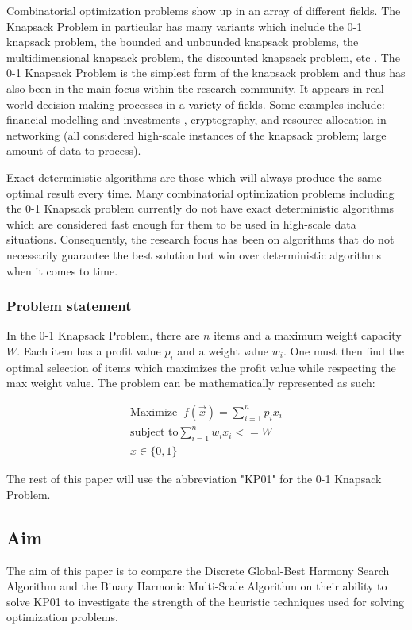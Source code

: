 \documentclass[titlepage]{article}
\begin{document}
Combinatorial optimization problems show up in an array of different fields. The Knapsack Problem in particular has many variants which include the 0-1 knapsack problem, the bounded and unbounded knapsack problems, the multidimensional knapsack problem, the discounted knapsack problem, etc \cite{knapsackVariants}. The 0-1 Knapsack Problem is the simplest form of the knapsack problem and thus has also been in the main focus within the research community. It appears in real-world decision-making processes in a variety of fields. Some examples include: financial modelling and investments \cite{finance}, cryptography, and resource allocation in networking \cite{resource} (all considered high-scale instances of the knapsack problem; large amount of data to process).

Exact deterministic algorithms are those which will always produce the same optimal result every time. Many combinatorial optimization problems including the 0-1 Knapsack problem currently do not have exact deterministic algorithms which are considered fast enough for them to be used in high-scale data situations. Consequently, the research focus has been on algorithms that do not necessarily guarantee the best solution but win over deterministic algorithms when it comes to time. 

\subsubsection*{Problem statement}
In the 0-1 Knapsack Problem, there are $n$ items and a maximum weight capacity $W$. Each item has a profit value $p_i$ and a weight value $w_i$. One must then find the optimal selection of items which maximizes the profit value while respecting the max weight value. The problem can be mathematically represented as such:

\vskip -0.5cm

\begin{gather}
    \text{Maximize}\;\; f(\Vec{x}) = \sum_{i = 1}^{n} p_i x_i \\
    \text{subject to} \sum_{i = 1}^{n} w_i x_i <= W \\
    x \in \{0, 1\}
\end{gather}

The rest of this paper will use the abbreviation "KP01" for the 0-1 Knapsack Problem. 

\subsection{Aim}
The aim of this paper is to compare the Discrete Global-Best Harmony Search Algorithm and the Binary Harmonic Multi-Scale Algorithm on their ability to solve KP01 to investigate the strength of the heuristic  techniques used for solving optimization problems.
\end{document}
